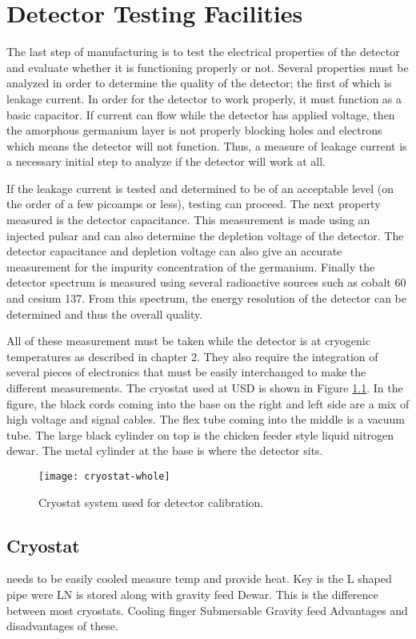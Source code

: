 \chapter{Detector Testing Facilities}
The last step of manufacturing is to test the electrical properties of the detector and evaluate whether it is functioning properly or not.
Several properties must be analyzed in order to determine the quality of the detector; the first of which is leakage current.
In order for the detector to work properly, it must function as a basic capacitor.
If current can flow while the detector has applied voltage, then the amorphous germanium layer is not properly blocking holes and electrons which means the detector will not function.
Thus, a measure of leakage current is a necessary initial step to analyze if the detector will work at all.

If the leakage current is tested and determined to be of an acceptable level (on the order of a few picoamps or less), testing can proceed.
The next property measured is the detector capacitance.
This measurement is made using an injected pulsar and can also determine the depletion voltage of the detector.
The detector capacitance and depletion voltage can also give an accurate measurement for the impurity concentration of the germanium.
Finally the detector spectrum is measured using several radioactive sources such as cobalt 60 and cesium 137.
From this spectrum, the energy resolution of the detector can be determined and thus the overall quality.

All of these measurement must be taken while the detector is at cryogenic temperatures as described in chapter 2.
They also require the integration of several pieces of electronics that must be easily interchanged to make the different measurements.
The cryostat used at USD is shown in Figure \ref{fig:cryostat-whole}.
In the figure, the black cords coming into the base on the right and left side are a mix of high voltage and signal cables.
The flex tube coming into the middle is a vacuum tube.
The large black cylinder on top is the chicken feeder style liquid nitrogen dewar.
The metal cylinder at the base is where the detector sits.
\begin{figure}[htpb]
\centering
\texttt{[image: cryostat-whole]}
\caption{Cryostat system used for detector calibration.}
\label{fig:cryostat-whole}
\end{figure}

\section{Cryostat}
needs to be easily cooled
measure temp and provide heat.
Key is the L shaped pipe were LN is stored along with gravity feed Dewar. This is the difference between most cryostats.
Cooling finger
Submersable 
Gravity feed
Advantages and disadvantages of these.

